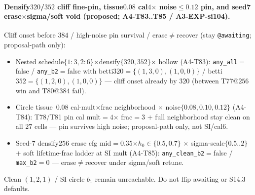 \documentclass[11pt]{article}
\begin{document}
\paragraph{Densify$320$/$352$ cliff fine-pin, tissue$0.08$ cal$4$$\times$
noise$\le 0.12$ pin, and seed7 erase$\times$sigma/soft void (proposed;
A4-T83..T85 / A3-EXP-si104).}
Cliff onset before $384$ / high-noise pin survival / erase$\neq$recover
(stay \texttt{@awaiting}; proposal-path only):
\begin{itemize}[leftmargin=1.5em]
  \item Nested schedule$\{1{:}3,2{:}6\}$$\times$densify$\{320,352\}$$\times$
  hollow (A4-T83): \texttt{any\_all}${=}$false /
  \texttt{any\_b2}${=}$false with betti$320{=}\{(1,3,0),(1,0,0)\}$ /
  betti$352{=}\{(1,2,0),(1,0,0)\}$ --- cliff onset already by $320$
  (between T77@$256$ win and T80@$384$ fail).
  \item Circle tissue~$0.08$ cal-mult$\times$frac neighborhood $\times$
  noise$\{0.08,0.10,0.12\}$ (A4-T84): T78/T81 pin cal mult${=}4$$\times$
  frac${=}3$ $+$ full neighborhood stay clean on all $27$ cells --- pin
  survives high noise; proposal-path only, not SI/cal$6$.
  \item Seed-$7$ densify$256$ erase cfg mid${=}0.35$$\times h_0\in\{0.5,0.7\}$
  $\times$ sigma-scale$\{0.5..2\}$ $+$ soft lifetime-frac ladder at SI
  mult (A4-T85): \texttt{any\_clean\_b2}${=}$false /
  \texttt{max\_b2}${=}0$ --- erase$\neq$recover under sigma/soft retune.
\end{itemize}
Clean $(1,2,1)$ / SI circle $b_1$ remain unreachable. Do not flip
awaiting or S14.3 defaults.
\end{document}
